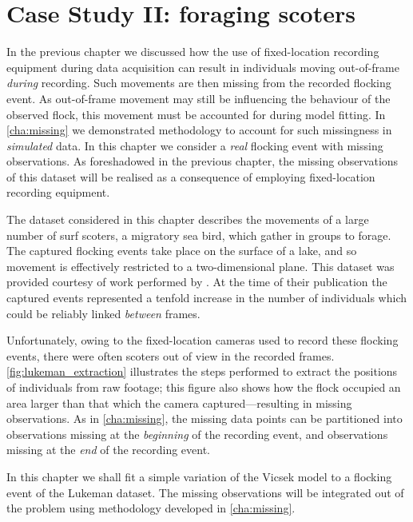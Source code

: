 \graphicspath{{fig/scoters/}}

\chapter{Case Study II: foraging scoters}
\label{cha:scoters}

In the previous chapter we discussed how the use of fixed-location recording
equipment during data acquisition can result in individuals moving out-of-frame
\emph{during} recording. Such movements are then missing from the recorded
flocking event. As out-of-frame movement may still be influencing the behaviour
of the observed flock, this movement must be accounted for during model
fitting. In \cref{cha:missing} we demonstrated methodology to account for such
missingness in \emph{simulated} data. In this chapter we consider a \emph{real}
flocking event with missing observations. As foreshadowed in the previous
chapter, the missing observations of this dataset will be realised as a
consequence of employing fixed-location recording equipment.

The dataset considered in this chapter describes the movements of a large
number of surf scoters, a migratory sea bird, which gather in groups to forage.
The captured flocking events take place on the surface of a lake, and so
movement is effectively restricted to a two-dimensional plane. This dataset was
provided courtesy of work performed by \textcite{lukeman09,lukeman10}. At the
time of their publication the captured events represented a tenfold increase in
the number of individuals which could be reliably linked \emph{between} frames.

Unfortunately, owing to the fixed-location cameras used to record these
flocking events, there were often scoters out of view in the recorded frames.
\cref{fig:lukeman_extraction} illustrates the steps performed to extract the
positions of individuals from raw footage; this figure also shows how the flock
occupied an area larger than that which the camera captured---resulting in
missing observations. As in \cref{cha:missing}, the missing data points can be
partitioned into observations missing at the \emph{beginning} of the recording
event, and observations missing at the \emph{end} of the recording event.

In this chapter we shall fit a simple variation of the Vicsek model to a
flocking event of the Lukeman dataset. The missing observations will be
integrated out of the problem using methodology developed in
\cref{cha:missing}.

